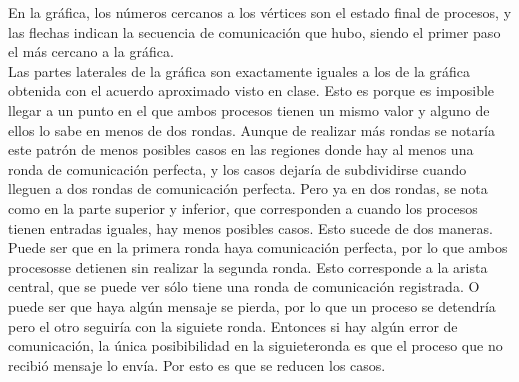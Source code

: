 \documentclass[12pt,a4paper]{report}
\begin{document}
\begin{enumerate}
{

		En la gráfica, los números cercanos a los vértices son el estado final de
		procesos, y las flechas indican la secuencia de comunicación que hubo,
		siendo el primer paso el más cercano a la gráfica.\\
		Las partes laterales de la gráfica son exactamente iguales a los de la
		gráfica obtenida con el acuerdo aproximado visto en clase. Esto es porque
		es imposible llegar a un punto en el que ambos procesos tienen un mismo
		valor y alguno de ellos lo sabe en menos de dos rondas.
		Aunque de realizar más rondas se notaría este patrón de menos posibles casos
		en las regiones donde hay al menos una ronda de comunicación perfecta, y
		los casos dejaría de subdividirse cuando lleguen a dos rondas de comunicación
		perfecta.
		Pero ya en dos rondas, se nota como en la parte superior y inferior, que
		corresponden a cuando los procesos tienen entradas iguales, hay menos posibles
		casos.
		Esto sucede de dos maneras.
		Puede ser que en la primera ronda haya comunicación perfecta, por lo que
		ambos procesosse detienen sin realizar la segunda ronda.
		Esto corresponde a la arista central, que se puede ver sólo tiene una ronda
		de comunicación registrada.
		O puede ser que haya algún mensaje se pierda, por lo que un proceso se
		detendría pero el otro seguiría con la siguiete ronda. Entonces si hay algún
		error de comunicación, la única posibibilidad en la siguieteronda es que
		el proceso que no recibió mensaje lo envía. Por esto es que se reducen los
		casos.
	}


\end{enumerate}
\end{document}
